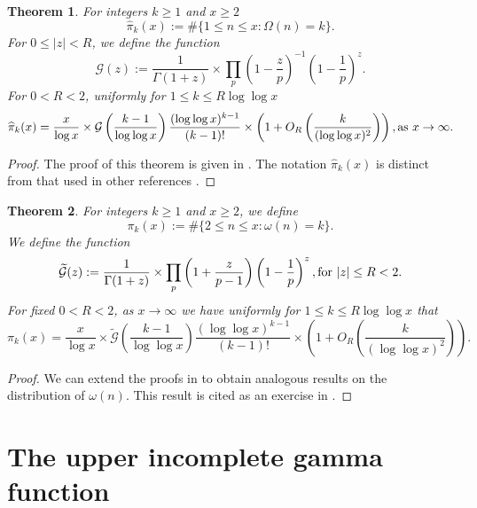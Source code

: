 \documentclass[11pt,reqno,a4letter]{article}
\numberwithin{equation}{section}
\numberwithin{figure}{section}
\numberwithin{table}{section}
\let\citep\cite
\newcommand{\cf}{cf.~}
\theoremstyle{plain}
\newtheorem{theorem}{Theorem}
\numberwithin{theorem}{section}
\theoremstyle{definition}
\theoremstyle{remark}
\newcommand{\mathtext}[1]{\text{\rm #1}}
\begin{document}
\begin{theorem}
\label{theorem_HatPi_ExtInTermsOfGz} 
For integers $k \geq 1$ and $x \geq 2$ 
$$\widehat{\pi}_k(x) := \#\{1 \leq n \leq x: \Omega(n)=k\}.$$ 
For $0 \leq |z| < R$, we define the function 
\[
\mathcal{G}(z) := \frac{1}{\Gamma(1+z)} \times 
	\prod_p \left(1-\frac{z}{p}\right)^{-1} \left(1-\frac{1}{p}\right)^z. 
\]
For $0 < R < 2$, uniformly for $1 \leq k \leq R \log\log x$ 
\begin{equation}
\label{eqn_PiHatkx_UniformAsymptoticsStmt_from_MV_v1}
\widehat{\pi}_k(x) = \frac{x}{\log x} \times \mathcal{G}\left(\frac{k-1}{\log\log x}\right) 
     \frac{(\log\log x)^{k-1}}{(k-1)!} \times \left(1 + O_R\left(\frac{k}{(\log\log x)^2}\right)\right), 
     \mathtext{ as } x \rightarrow \infty. 
\end{equation}
\end{theorem}
\begin{proof}
The proof of this theorem is given in \cite[Thm.~7.19; \S 7.4]{MV}. 
The notation $\widehat{\pi}_k(x)$ is distinct from that used in 
other references \citep[Eqn.~(7.61)]{MV} \citep[\cf \S II.6]{TENENBAUM-PROBNUMT-METHODS}. 
\end{proof}

\begin{theorem} 
\label{remark_MV_Pikx_FuncResultsAnnotated_v1} 
For integers $k  \geq 1$ and $x \geq 2$, we define 
\[
\pi_k(x) := \#\{2 \leq n \leq x: \omega(n)=k\}.
\]
We define the function 
\[
\widetilde{\mathcal{G}}(z) := \frac{1}{\Gamma(1+z)} \times 
	\prod_p \left(1 + \frac{z}{p-1}\right) \left(1 - \frac{1}{p}\right)^{z}, 
	\mathtext{ for } |z| \leq R < 2. 
\]
For fixed $0 < R < 2$, as $x \rightarrow \infty$ we have 
uniformly for $1 \leq k \leq R\log\log x$ that 
\begin{equation}
\label{eqn_Pikx_UniformAsymptoticsStmt_from_MV_v2} 
\pi_k(x) = \frac{x}{\log x} \times 
     \widetilde{\mathcal{G}}\left(\frac{k-1}{\log\log x}\right) 
     \frac{(\log\log x)^{k-1}}{(k-1)!} \times \left( 
     1 + O_R\left(\frac{k}{(\log\log x)^2}\right) 
     \right). 
\end{equation}
\end{theorem}
\begin{proof}
We can extend the proofs in \cite[\S 7]{MV} to obtain 
analogous results on the distribution of $\omega(n)$. 
This result is cited as an exercise in \cite{MV}. 
\end{proof}

\section{The upper incomplete gamma function} 
\label{subSection_OtherFactsAndResults} 
\end{document}
